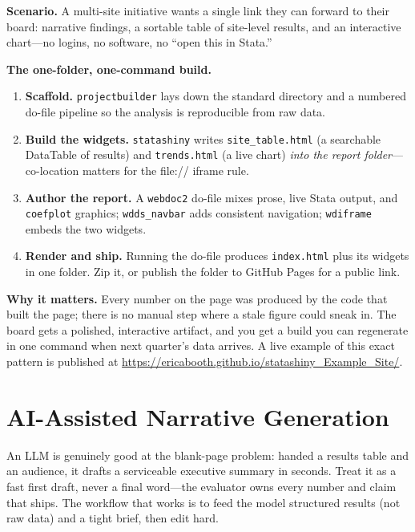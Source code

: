 \documentclass[
    a4paper,
    fontsize=10pt,
    twoside=true,
    numbers=noenddot,
]{kaobook}
\providecommand{\Option}[1]{\textsf{#1}}
\newcounter{appliedexample}
\newenvironment{appliedexample}[1][]{%
    \refstepcounter{appliedexample}%
    \begin{appliedexamplebox}[frametitle={Applied Example~\theappliedexample.~~#1}]%
}{%
    \end{appliedexamplebox}%
}
\begin{document}
\begin{appliedexample}[From Do-File to Shareable Project Portal]
\textbf{Scenario.} A multi-site initiative wants a single link they can forward to their board: narrative findings, a sortable table of site-level results, and an interactive chart---no logins, no software, no \enquote{open this in Stata.}

\medskip
\textbf{The one-folder, one-command build.}
\begin{enumerate}
    \item \textbf{Scaffold.} \texttt{projectbuilder} lays down the standard directory and a numbered do-file pipeline so the analysis is reproducible from raw data.
    \item \textbf{Build the widgets.} \texttt{statashiny} writes \texttt{site\_table.html} (a searchable DataTable of results) and \texttt{trends.html} (a live chart) \emph{into the report folder}---co-location matters for the \Option{file://} iframe rule.
    \item \textbf{Author the report.} A \texttt{webdoc2} do-file mixes prose, live Stata output, and \texttt{coefplot} graphics; \texttt{wdds\_navbar} adds consistent navigation; \texttt{wdiframe} embeds the two widgets.
    \item \textbf{Render and ship.} Running the do-file produces \texttt{index.html} plus its widgets in one folder. Zip it, or publish the folder to GitHub Pages for a public link.
\end{enumerate}

\medskip
\textbf{Why it matters.} Every number on the page was produced by the code that built the page; there is no manual step where a stale figure could sneak in. The board gets a polished, interactive artifact, and you get a build you can regenerate in one command when next quarter's data arrives. A live example of this exact pattern is published at \url{https://ericabooth.github.io/statashiny_Example_Site/}.
\end{appliedexample}

\section{AI-Assisted Narrative Generation}
An LLM is genuinely good at the blank-page problem: handed a results table and an audience, it drafts a serviceable executive summary in seconds. Treat it as a fast first draft, never a final word---the evaluator owns every number and claim that ships. The workflow that works is to feed the model structured results (not raw data) and a tight brief, then edit hard.
\end{document}
